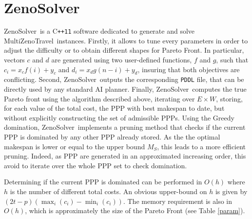 \documentclass{llncs}
\def\MULTIZENO{{\sc MultiZenoTravel}}
\def\ZENOSOLVER{{\sc ZenoSolver}}
\newcommand{\mycomment}[1]{{\bf \textcolor{red}{#1}}}
\newcommand{\alexcomment}[1]{{\bf \textcolor{blue}{#1}}}
\begin{document}
\section{\ZENOSOLVER}
\label{sec:zenosolver}
\ZENOSOLVER\ is a C\texttt{++11} software dedicated to generate and solve \MULTIZENO\ instances. Firstly, it allows to tune every parameters in order to adjust the difficulty or to obtain different shapes for Pareto Front. 
In particular, vectors $c$ and $d$ are generated using two user-defined functions, $f$ and $g$, such that $c_i = x_cf(i)+y_c$ and $d_i = x_dg(n-i)+y_d$, insuring that both objectives are conflicting.
Second, \ZENOSOLVER\ outputs the corresponding \texttt{PDDL} file, that can be directly used by any standard AI planner.
Finally, \ZENOSOLVER\ computes the true Pareto front using the algorithm described above, iterating over $E \times W$, storing, for each value of the total cost, the PPP with best makespan to date, but without explicitly constructing the set of admissible PPPs. Using the Greedy domination, \ZENOSOLVER\ implements a pruning method that checks if the current PPP is dominated by any other PPP already stored. As the the optimal makespan is lower or equal to the upper bound $M_S$, this leads to a more efficient pruning. Indeed, as PPP are generated in an approximated increasing order, this avoid to iterate over the whole PPP set to check domination.

Determining if the current PPP is dominated can be performed in $O(h)$ where $h$ is the number of different total costs. 
An obvious upper-bound on $h$ is given by $(2t-p)(\max_i(c_i) - \min_i(c_i))$.
The memory requirement is also in $O(h)$, which is approximately the size of the Pareto Front (see Table \ref{param}).
\end{document}
